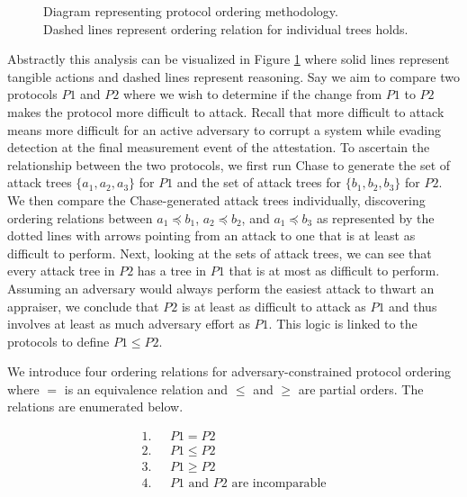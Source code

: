 \documentclass[runningheads]{llncs}
\theoremstyle{definition}
\begin{document}
\begin{figure}[hbtp]
    \centering
    \captionsetup{justification=centering,margin=1cm}
    
    \caption[Protocol ordering abstraction]{Diagram representing protocol ordering methodology. \\ Dashed lines represent ordering relation for individual trees holds. }
    \label{fig:protocol-org-fig}
\end{figure}

Abstractly this analysis can be visualized in Figure \ref{fig:protocol-org-fig} where solid lines represent tangible actions and dashed lines represent reasoning. Say we aim to compare two protocols $P1$ and $P2$ where we wish to determine if the change from $P1$ to $P2$ makes the protocol more difficult to attack. Recall that more difficult to attack means more difficult for an active adversary to corrupt a system while evading detection at the final measurement event of the attestation. To ascertain the relationship between the two protocols, we first run Chase to generate the set of attack trees $\{ a_1, a_2, a_3\}$ for $P1$ and the set of attack trees for $\{b_1, b_2, b_3\}$ for $P2$. We then compare the Chase-generated attack trees individually, discovering ordering relations between $a_1 \preceq b_1$, $a_2 \preceq b_2$, and $a_1 \preceq b_3$ as represented by the dotted lines with arrows pointing from an attack to one that is at least as difficult to perform. Next, looking at the sets of attack trees, we can see that every attack tree in $P2$ has a tree in $P1$ that is at most as difficult to perform. Assuming an adversary would always perform the easiest attack to thwart an appraiser, we conclude that $P2$ is at least as difficult to attack as $P1$ and thus involves at least as much adversary effort as $P1$. This logic is linked to the protocols to define $ P1 \leq P2$.  

We introduce four ordering relations for adversary-constrained protocol ordering where $=$ is an equivalence relation and $\le$ and $\ge$ are partial orders. The relations are enumerated below.

\vspace*{-5mm}

\begin{align*}
1. & \text{ } P1 = P2 \\
2. & \text{ } P1 \le P2 \\
3. & \text{ } P1 \ge P2 \\
4. & \text{ } P1 \text{ and } P2 \text{ are incomparable}
\end{align*}
\end{document}
